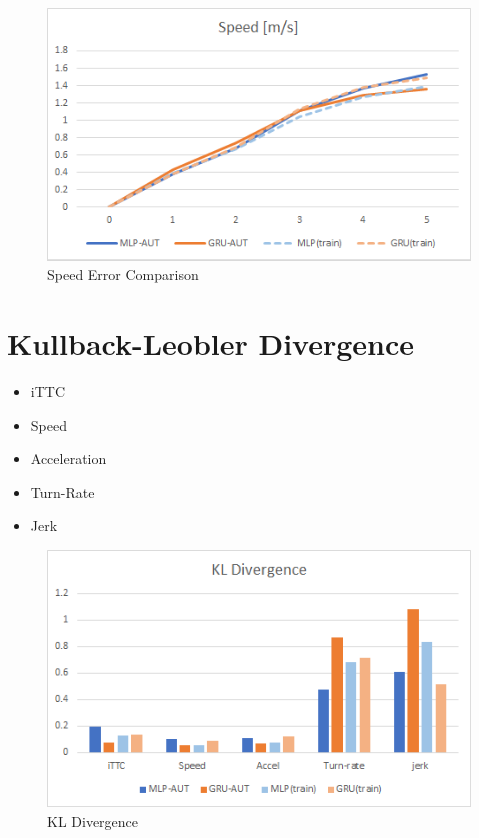 \begin{figure}[H]
\begin{center}
\includegraphics[width=14cm]{./figures/graph_speed.png}
\caption{Speed Error Comparison}
\label{fig:graph_speed}
\end{center}
\end{figure}


\section{Kullback-Leobler Divergence}


\begin{itemize}
\item iTTC
\item Speed
\item Acceleration
\item Turn-Rate
\item Jerk
\end{itemize}

\begin{figure}[H]
\begin{center}
\includegraphics[width=14cm]{./figures/graph_kldivergence.png}
\caption{KL Divergence}
\label{fig:graph_kldivergence}
\end{center}
\end{figure}


